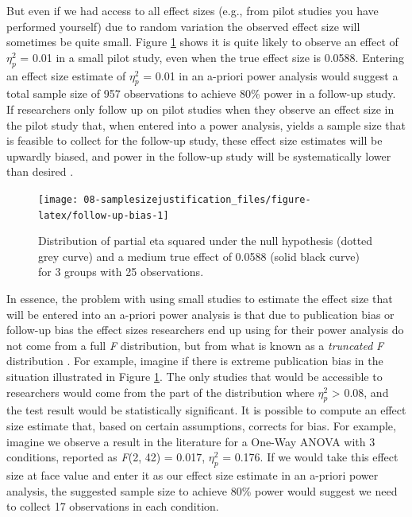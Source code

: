 \documentclass[
  oneside]{book}
\begin{document}
But even if we had access to all effect sizes (e.g., from pilot studies you have performed yourself) due to random variation the observed effect size will sometimes be quite small. Figure \ref{fig:follow-up-bias} shows it is quite likely to observe an effect of \(\eta_p^2\) = 0.01 in a small pilot study, even when the true effect size is 0.0588. Entering an effect size estimate of \(\eta_p^2\) = 0.01 in an a-priori power analysis would suggest a total sample size of 957 observations to achieve 80\% power in a follow-up study. If researchers only follow up on pilot studies when they observe an effect size in the pilot study that, when entered into a power analysis, yields a sample size that is feasible to collect for the follow-up study, these effect size estimates will be upwardly biased, and power in the follow-up study will be systematically lower than desired \citep{albers_when_2018}.

\begin{figure}

{\centering \texttt{[image: 08-samplesizejustification\_files/figure-latex/follow-up-bias-1]} 

}

\caption{Distribution of partial eta squared under the null hypothesis (dotted grey curve) and a medium true effect of 0.0588 (solid black curve) for 3 groups with 25 observations.}\label{fig:follow-up-bias}
\end{figure}

In essence, the problem with using small studies to estimate the effect size that will be entered into an a-priori power analysis is that due to publication bias or follow-up bias the effect sizes researchers end up using for their power analysis do not come from a full \emph{F} distribution, but from what is known as a \emph{truncated} \emph{F} distribution \citep{taylor_bias_1996}. For example, imagine if there is extreme publication bias in the situation illustrated in Figure \ref{fig:follow-up-bias}. The only studies that would be accessible to researchers would come from the part of the distribution where \(\eta_p^2\) \textgreater{} 0.08, and the test result would be statistically significant. It is possible to compute an effect size estimate that, based on certain assumptions, corrects for bias. For example, imagine we observe a result in the literature for a One-Way ANOVA with 3 conditions, reported as \emph{F}(2, 42) = 0.017, \(\eta_p^2\) = 0.176. If we would take this effect size at face value and enter it as our effect size estimate in an a-priori power analysis, the suggested sample size to achieve 80\% power would suggest we need to collect 17 observations in each condition.
\end{document}
